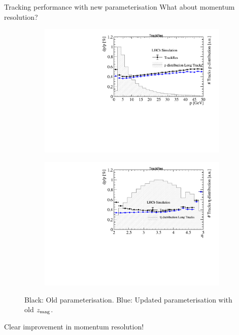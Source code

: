 \documentclass[xcolor={dvipsnames}]{beamer}
\begin{document}
\begin{frame}{Tracking performance with new parameterisation}
  \vspace{0.0cm}
  {\Large What about momentum resolution?}
  \begin{figure}[htb]
    \centering
    \begin{subfigure}{0.50\textwidth}
      \includegraphics[width=1\textwidth]{Plots/Track_resolution_p_comparison.pdf}
    \end{subfigure}%
    \begin{subfigure}{0.50\textwidth}
      \includegraphics[width=1\textwidth]{Plots/Track_resolution_eta_comparison.pdf}
    \end{subfigure}
    \vspace{-0.2cm}
    \caption*{Black: Old parameterisation. {\color{blue}Blue: Updated parameterisation with old $z_{\rm mag}$}.}
  \end{figure}
  {\Large Clear improvement in momentum resolution!}
\end{frame}
\end{document}
